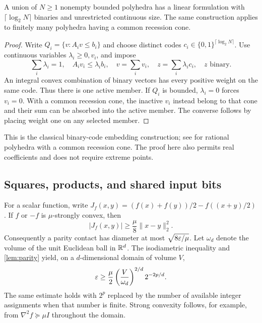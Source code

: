 \begin{lemma}\label{lem:disjunction}
A union of $N\ge1$ nonempty bounded polyhedra has a linear formulation
with $\lceil\log_2N\rceil$ binaries and unrestricted continuous size.
The same construction applies to finitely many polyhedra having a common
recession cone.
\end{lemma}
\begin{proof}
Write $Q_i=\{v:A_iv\le b_i\}$ and choose distinct codes
$c_i\in\{0,1\}^{\lceil\log_2N\rceil}$. Use continuous variables
$\lambda_i\ge0,v_i$, and impose
\[
 \sum_i\lambda_i=1,\quad A_iv_i\le\lambda_i b_i,\quad
 v=\sum_i v_i,\quad z=\sum_i\lambda_i c_i,\quad z\text{ binary}.
\]
An integral convex combination of binary vectors has every positive
weight on the same code. Thus there is one active member. If $Q_i$ is
bounded, $\lambda_i=0$ forces $v_i=0$. With a common recession cone,
the inactive $v_i$ instead belong to that cone and their sum can be
absorbed into the active member. The converse follows by placing weight
one on any selected member.
\end{proof}

This is the classical binary-code embedding construction; see
\citet[Proposition 1 and Corollary 1]{vielma2018} for rational polyhedra
with a common recession cone. The proof here also permits real
coefficients and does not require extreme points.

\subsection{Squares, products, and shared input bits}

For a scalar function, write
$J_f(x,y)=(f(x)+f(y))/2-f((x+y)/2)$. If $f$ or $-f$ is
$\mu$-strongly convex, then
\begin{equation}\label{eq:strong-midpoint}
 |J_f(x,y)|\ge\frac\mu8\|x-y\|_2^2.
\end{equation}
Consequently a parity contact has diameter at most
$\sqrt{8\varepsilon/\mu}$. Let $\omega_d$ denote the volume of the unit
Euclidean ball in $\mathbb R^d$. The isodiametric inequality and
\cref{lem:parity} yield, on a $d$-dimensional domain of volume $V$,
\begin{equation}\label{eq:strong-lower}
 \varepsilon\ge\frac\mu2\left(\frac{V}{\omega_d}\right)^{2/d}2^{-2p/d}.
\end{equation}
The same estimate holds with $2^p$ replaced by the number of available
integer assignments when that number is finite. Strong convexity follows,
for example, from $\nabla^2f\succeq\mu I$ throughout the domain.

